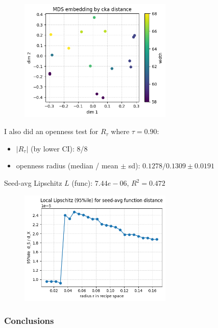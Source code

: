\documentclass[12pt]{article}
\begin{document}
\begin{figure}[h]
    \centering
    \includegraphics[width=0.65\textwidth]{figures/A5/local continuity/mds embedding by cka distance.png}
\end{figure}

I also did an openness test for $R_\tau$ where $\tau = 0.90$:
\begin{itemize}
    \item $|R_\tau|$ (by lower CI): 8/8
    \item openness radius (median / mean $\pm$ sd): $0.1278 / 0.1309 \pm  0.0191$
\end{itemize}

Seed-avg Lipschitz $L$ (func): $7.44e-06$, $R^2=0.472$

\begin{figure}[h]
    \centering
    \includegraphics[width=0.65\textwidth]{A5/local continuity/local lipshitz for m_phi function distance.png}
\end{figure}

\clearpage
\subsubsection{Conclusions}
\end{document}
